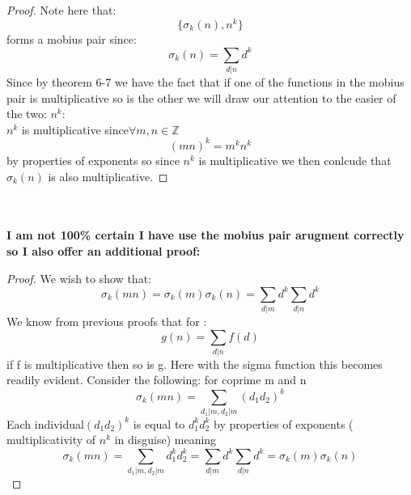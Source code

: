 \documentclass[11pt]{article}
\theoremstyle{definition}  %
\newcommand{\Z}{\mathbb{Z}}
\begin{document}
\begin{proof}
Note here that:
\[
  \{\sigma_k(n),n^k\}
\]
forms a mobius pair since:
\[
  \sigma_k(n)=\sum_{d|n}d^k
\]
Since by theorem 6-7 we have the fact that if one of the functions in  the mobius pair is multiplicative so is the other we will draw our attention to the easier of the two: $n^k$:
\\
$n^k$ is multiplicative since$ \forall m,n \in \Z$
\[
  (mn)^k=m^kn^k
\]
by properties of exponents so since $n^k$ is multiplicative we then conlcude that $\sigma_k(n)$ is also multiplicative.\end{proof}\\\\\textbf{ I am not 100\% certain I have use the mobius pair arugment correctly so I also offer an additional proof:}
\begin{proof}
  We wish to show that: \[
    \sigma_k(mn)=\sigma_k(m)\sigma_k(n)=\sum_{d|m}d^k\sum_{d|n}d^k
  \]
  We know from previous proofs that for :
  \[
      g(n)=\sum_{d|n}f(d)
  \]
  if f is multiplicative then so is g. Here with the sigma function this becomes readily evident. Consider the following: for coprime m and n
\[
  \sigma_k(mn)=\sum_{d_1|m,d_2|m}(d_1d_2)^k
\]
Each individual$(d_1d_2)^k$ is equal to $d_1^kd_2^k$ by properties of exponents ( multiplicativity of $n^k$ in disguise) meaning
\[
    \sigma_k(mn)=\sum_{d_1|m,d_2|m}d_1^kd_2^k=\sum_{d|m}d^k\sum_{d|n}d^k=\sigma_k(m)\sigma_k(n)
\]
\end{proof}
\end{document}
